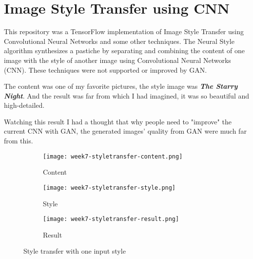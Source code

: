 \section{Image Style Transfer using CNN}\cite{styletransfergithub}
This repository was a TensorFlow implementation of Image Style Transfer using Convolutional Neural Networks\cite{styletransfer} and some other techniques\cite{styletransfervideo}\cite{preservingcolor}. The Neural Style algorithm synthesizes a pastiche by separating and combining the content of one image with the style of another image using Convolutional Neural Networks (CNN). These techniques were not supported or improved by GAN.

The content was one of my favorite pictures, the style image was \textbf{\emph{The Starry Night}}\cite{thestarrynight}. And the result was far from which I had imagined, it was so beautiful and high-detailed.

Watching this result I had a thought that why people need to "improve" the current CNN with GAN, the generated images' quality from GAN were much far from this.

\newpage
\begin{figure}[!ht]
\centering
\begin{subfigure}{\textwidth}
  \centering
  \texttt{[image: week7-styletransfer-content.png]}
  \caption{Content}
\end{subfigure}
\begin{subfigure}{\textwidth}
  \centering
  \texttt{[image: week7-styletransfer-style.png]}
  \caption{Style}
\end{subfigure}
\begin{subfigure}{\textwidth}
  \centering
  \texttt{[image: week7-styletransfer-result.png]}
  \caption{Result}
\end{subfigure}
\caption{Style transfer with one input style}
\end{figure}